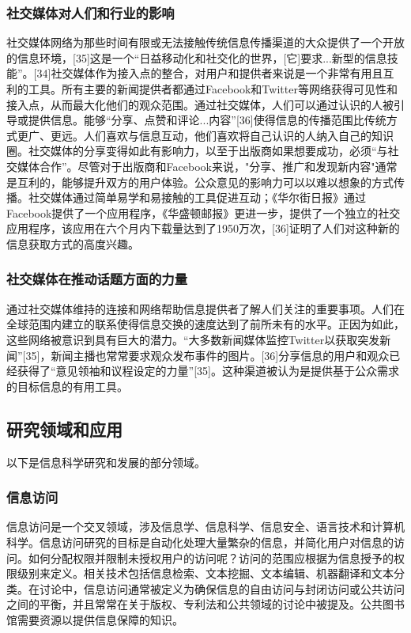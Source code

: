 \subsubsection{社交媒体对人们和行业的影响}
社交媒体网络为那些时间有限或无法接触传统信息传播渠道的大众提供了一个开放的信息环境，[35]这是一个“日益移动化和社交化的世界，[它]要求...新型的信息技能”。[34]社交媒体作为接入点的整合，对用户和提供者来说是一个非常有用且互利的工具。所有主要的新闻提供者都通过Facebook和Twitter等网络获得可见性和接入点，从而最大化他们的观众范围。通过社交媒体，人们可以通过认识的人被引导或提供信息。能够“分享、点赞和评论...内容”[36]使得信息的传播范围比传统方式更广、更远。人们喜欢与信息互动，他们喜欢将自己认识的人纳入自己的知识圈。社交媒体的分享变得如此有影响力，以至于出版商如果想要成功，必须“与社交媒体合作”。尽管对于出版商和Facebook来说，"分享、推广和发现新内容"通常是互利的，能够提升双方的用户体验。公众意见的影响力可以以难以想象的方式传播。社交媒体通过简单易学和易接触的工具促进互动；《华尔街日报》通过Facebook提供了一个应用程序，《华盛顿邮报》更进一步，提供了一个独立的社交应用程序，该应用在六个月内下载量达到了1950万次，[36]证明了人们对这种新的信息获取方式的高度兴趣。
\subsubsection{社交媒体在推动话题方面的力量} 
通过社交媒体维持的连接和网络帮助信息提供者了解人们关注的重要事项。人们在全球范围内建立的联系使得信息交换的速度达到了前所未有的水平。正因为如此，这些网络被意识到具有巨大的潜力。“大多数新闻媒体监控Twitter以获取突发新闻”[35]，新闻主播也常常要求观众发布事件的图片。[36]分享信息的用户和观众已经获得了“意见领袖和议程设定的力量”[35]。这种渠道被认为是提供基于公众需求的目标信息的有用工具。
\subsection{研究领域和应用}
以下是信息科学研究和发展的部分领域。
\subsubsection{信息访问}  
信息访问是一个交叉领域，涉及信息学、信息科学、信息安全、语言技术和计算机科学。信息访问研究的目标是自动化处理大量繁杂的信息，并简化用户对信息的访问。如何分配权限并限制未授权用户的访问呢？访问的范围应根据为信息授予的权限级别来定义。相关技术包括信息检索、文本挖掘、文本编辑、机器翻译和文本分类。在讨论中，信息访问通常被定义为确保信息的自由访问与封闭访问或公共访问之间的平衡，并且常常在关于版权、专利法和公共领域的讨论中被提及。公共图书馆需要资源以提供信息保障的知识。
